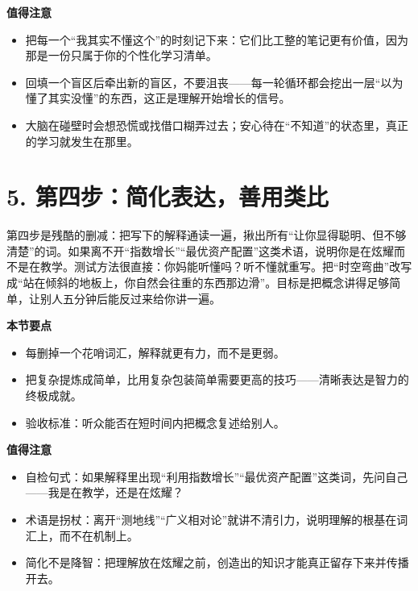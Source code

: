 \documentclass[UTF8,a4paper,11pt]{ctexart}
\begin{document}
\begin{keyconcept}
\textbf{值得注意}
\begin{itemize}
  \item 把每一个“我其实不懂这个”的时刻记下来：它们比工整的笔记更有价值，因为那是一份只属于你的个性化学习清单。
  \item 回填一个盲区后牵出新的盲区，不要沮丧——每一轮循环都会挖出一层“以为懂了其实没懂”的东西，这正是理解开始增长的信号。
  \item 大脑在碰壁时会想恐慌或找借口糊弄过去；安心待在“不知道”的状态里，真正的学习就发生在那里。
\end{itemize}
\end{keyconcept}


\section*{5. 第四步：简化表达，善用类比}

第四步是残酷的删减：把写下的解释通读一遍，揪出所有“让你显得聪明、但不够清楚”的词。如果离不开“指数增长”“最优资产配置”这类术语，说明你是在炫耀而不是在教学。测试方法很直接：你妈能听懂吗？听不懂就重写。把“时空弯曲”改写成“站在倾斜的地板上，你自然会往重的东西那边滑”。目标是把概念讲得足够简单，让别人五分钟后能反过来给你讲一遍。

\begin{keyconcept}
\textbf{本节要点}
\begin{itemize}
  \item 每删掉一个花哨词汇，解释就更有力，而不是更弱。
  \item 把复杂提炼成简单，比用复杂包装简单需要更高的技巧——清晰表达是智力的终极成就。
  \item 验收标准：听众能否在短时间内把概念复述给别人。
\end{itemize}
\end{keyconcept}

\begin{center}
\end{center}

\begin{keyconcept}
\textbf{值得注意}
\begin{itemize}
  \item 自检句式：如果解释里出现“利用指数增长”“最优资产配置”这类词，先问自己——我是在教学，还是在炫耀？
  \item 术语是拐杖：离开“测地线”“广义相对论”就讲不清引力，说明理解的根基在词汇上，而不在机制上。
  \item 简化不是降智：把理解放在炫耀之前，创造出的知识才能真正留存下来并传播开去。
\end{itemize}
\end{keyconcept}
\end{document}
